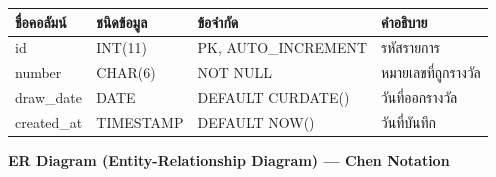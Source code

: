 \documentclass[a4paper,12pt]{article}
\begin{document}
\begin{tabularx}{\textwidth}{|l|l|l|X|}
\hline
\textbf{ชื่อคอลัมน์} & \textbf{ชนิดข้อมูล} & \textbf{ข้อจำกัด} & \textbf{คำอธิบาย} \\
\hline
id         & INT(11)   & PK, AUTO\_INCREMENT & รหัสรายการ \\
\hline
number     & CHAR(6)   & NOT NULL & หมายเลขที่ถูกรางวัล \\
\hline
draw\_date & DATE      & DEFAULT CURDATE() & วันที่ออกรางวัล \\
\hline
created\_at & TIMESTAMP & DEFAULT NOW() & วันที่บันทึก \\
\hline
\end{tabularx}

\newpage

\noindent\textbf{ER Diagram (Entity-Relationship Diagram) --- Chen Notation}

\vspace{0.8em}
\end{document}
